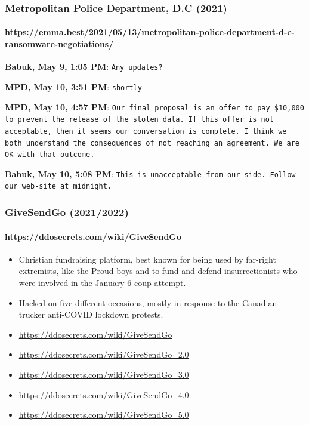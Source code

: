 \documentclass[aspectratio=169,usenames,dvipsnames]{beamer}
\begin{document}
\begin{frame}[c]
  \frametitle{Metropolitan Police Department, D.C (2021)}
  \framesubtitle{\url{https://emma.best/2021/05/13/metropolitan-police-department-d-c-ransomware-negotiations/}}

  \small

  \textbf{Babuk, May 9, 1:05 PM}: \texttt{Any updates?}

  \vspace{3mm} \pause

  \textbf{MPD, May 10, 3:51 PM}: \texttt{shortly}

  \vspace{3mm} \pause

  \textbf{MPD, May 10, 4:57 PM}: \texttt{Our final proposal is an offer to pay
  \$10,000 to prevent the release of the stolen data. If this offer is not
  acceptable, then it seems our conversation is complete. I think we both
  understand the consequences of not reaching an agreement. We are OK with
  that outcome.}

  \vspace{3mm} \pause

  \textbf{Babuk, May 10, 5:08 PM}: \texttt{This is unacceptable from our side.
  Follow our web-site at midnight.}

\end{frame}

\begin{frame}
  \frametitle{GiveSendGo (2021/2022)}
  \framesubtitle{\url{https://ddosecrets.com/wiki/GiveSendGo}}

  \begin{itemize}[<+->]
    \item Christian fundraising platform, best known for being used by
      far-right extremists, like the Proud boys and to fund and defend
      insurrectionists who were involved in the January 6 coup attempt.
    \item Hacked on five different occasions, mostly in response to the
      Canadian trucker anti-COVID lockdown protests.
    \item \url{https://ddosecrets.com/wiki/GiveSendGo}
    \item \url{https://ddosecrets.com/wiki/GiveSendGo_2.0}
    \item \url{https://ddosecrets.com/wiki/GiveSendGo_3.0}
    \item \url{https://ddosecrets.com/wiki/GiveSendGo_4.0}
    \item \url{https://ddosecrets.com/wiki/GiveSendGo_5.0}
  \end{itemize}

\end{frame}
\end{document}
